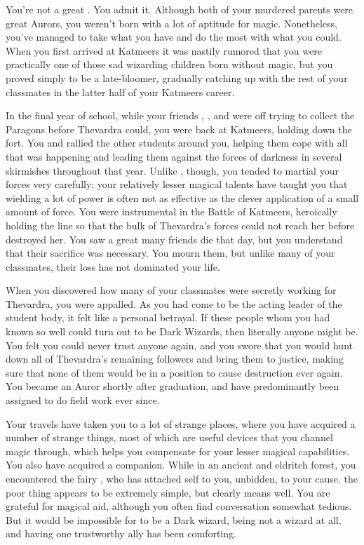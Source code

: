 \documentclass[char]{Katmeers}
\begin{document}
\name{\cNeville{}}


You're not a great \cNeville{\magician}. You admit it. Although both of your murdered parents were great Aurors, you weren't born with a lot of aptitude for magic. Nonetheless, you've managed to take what you have and do the most with what you could. When you first arrived at Katmeers it was nastily rumored that you were practically one of those sad wizarding children born without magic, but you proved simply to be a late-bloomer, gradually catching up with the rest of your classmates in the latter half of your Katmeers career.

In the final year of school, while your friends \cHarry{}, \cHermione{}, and \cRon{} were off trying to collect the Paragons before Thevardra could, you were back at Katmeers, holding down the fort. You and \cGinny{} rallied the other students around you, helping them cope with all that was happening and leading them against the forces of darkness in several skirmishes throughout that year. Unlike \cHarry{}, though, you tended to martial your forces very carefully; your relatively lesser magical talents have taught you that wielding a lot of power is often not as effective as the clever application of a small amount of force. You were instrumental in the Battle of Katmeers, heroically holding the line so that the bulk of Thevardra's forces could not reach her before \cHarry{} destroyed her. You saw a great many friends die that day, but you understand that their sacrifice was necessary. You mourn them, but unlike many of your classmates, their loss has not dominated your life.

When you discovered how many of your classmates were secretly working for Thevardra, you were appalled. As you had come to be the acting leader of the student body, it felt like a personal betrayal. If these people whom you had known so well could turn out to be Dark Wizards, then literally anyone might be. You felt you could never trust anyone again, and you swore that you would hunt down all of Thevardra's remaining followers and bring them to justice, making sure that none of them would be in a position to cause destruction ever again. You became an Auror shortly after graduation, and have predominantly been assigned to do field work ever since.

Your travels have taken you to a lot of strange places, where you have acquired a number of strange things, most of which are useful devices that you channel magic through, which helps you compensate for your lesser magical capabilities.  You also have acquired a companion. While in an ancient and eldritch forest, you encountered the fairy \cFairy{}, who has attached \cFairy{\their}self to you, unbidden, to your cause. the poor thing appears to be extremely simple, but \cFairy{\they} clearly means well. You are grateful for \cFairy{\their} magical aid, although you often find \cFairy{\their} conversation somewhat tedious. But it would be impossible for \cFairy{} to be a Dark wizard, being not a wizard at all, and having one trustworthy ally has been comforting.
\end{document}
